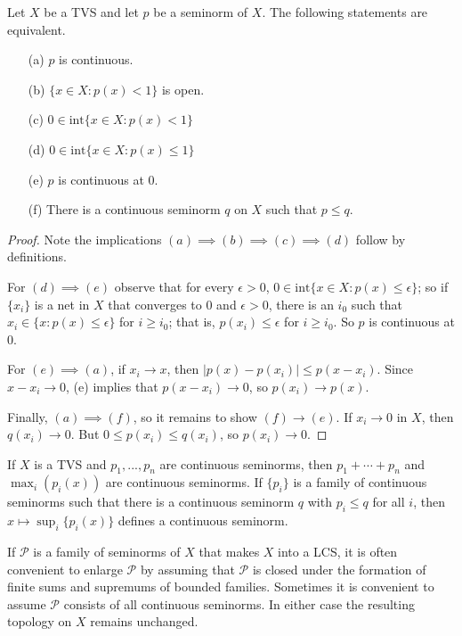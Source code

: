 \begin{prop}
    Let $X$ be a TVS and let $p$ be a seminorm of $X$. The following statements are equivalent. \begin{enumerate}
        \item[(a)] $p$ is continuous.
        \item[(b)] $\{x\in X:p(x) < 1\}$ is open.
        \item[(c)] $0 \in \text{int}\{x \in X:p(x) < 1\}$
        \item[(d)] $0 \in \text{int}\{x \in X:p(x) \leq 1\}$
        \item[(e)] $p$ is continuous at $0$.
        \item[(f)] There is a continuous seminorm $q$ on $X$ such that $p \leq q$.
    \end{enumerate}
\end{prop}
\begin{proof}
    Note the implications $(a)\implies(b)\implies(c)\implies(d)$ follow by definitions.

    For $(d)\implies(e)$ observe that for every $\epsilon > 0$, $0 \in\text{int}\{x \in X:p(x) \leq \epsilon\}$; so if $\{x_i\}$ is a net in $X$ that converges to $0$ and $\epsilon > 0$, there is an $i_0$ such that $x_i \in \{x:p(x) \leq \epsilon\}$ for $i \geq i_0$; that is, $p(x_i) \leq \epsilon$ for $i\geq i_0$. So $p$ is continuous at $0$.

    For $(e)\implies (a)$, if $x_i\rightarrow x$, then $|p(x) - p(x_i)| \leq p(x-x_i)$. Since  $x-x_i\rightarrow 0$, (e) implies that $p(x-x_i)\rightarrow 0$, so $p(x_i)\rightarrow p(x)$.

    Finally, $(a)\implies (f)$, so it remains to show $(f)\rightarrow (e)$. If $x_i\rightarrow 0$ in $X$, then $q(x_i)\rightarrow 0$. But $0 \leq p(x_i)\leq q(x_i)$, so $p(x_i)\rightarrow 0$.
\end{proof}

\begin{prop}
    If $X$ is a TVS and $p_1,...,p_n$ are continuous seminorms, then $p_1+\cdots+p_n$ and $\max_i(p_i(x))$ are continuous seminorms. If $\{p_i\}$ is a family of continuous seminorms such that there is a continuous seminorm $q$ with $p_i \leq q$ for all $i$, then $x\mapsto \sup_i\{p_i(x)\}$ defines a continuous seminorm.
\end{prop}

If $\mathscr{P}$ is a family of seminorms of $X$ that makes $X$ into a LCS, it is often convenient to enlarge $\mathscr{P}$ by assuming that $\mathscr{P}$ is closed under the formation of finite sums and supremums of bounded families. Sometimes it is convenient to assume $\mathscr{P}$ consists of all continuous seminorms. In either case the resulting topology on $X$ remains unchanged.

